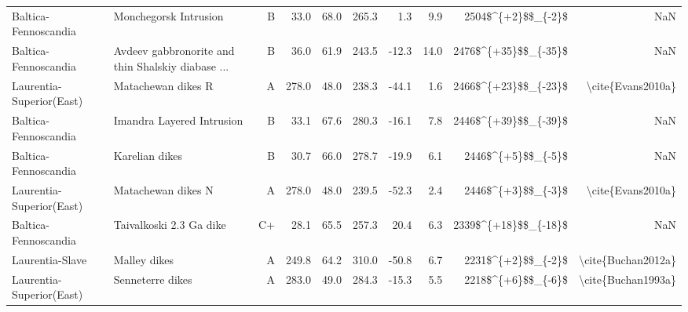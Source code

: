 \begin{longtable}{p{1 in}p{1 in}rrrrrrrr}
          Baltica-Fennoscandia &                              Monchegorsk Intrusion &      B &      33.0 &      68.0 & 265.3 &   1.3 &       9.9 &     2504\$\textasciicircum \{+2\}\$\$\_\{-2\}\$ &                                                NaN \\
          Baltica-Fennoscandia &  Avdeev gabbronorite and thin Shalskiy diabase ... &      B &      36.0 &      61.9 & 243.5 & -12.3 &      14.0 &   2476\$\textasciicircum \{+35\}\$\$\_\{-35\}\$ &                                                NaN \\
      Laurentia-Superior(East) &                                 Matachewan dikes R &      A &     278.0 &      48.0 & 238.3 & -44.1 &       1.6 &   2466\$\textasciicircum \{+23\}\$\$\_\{-23\}\$ &                                  \textbackslash cite\{Evans2010a\} \\
          Baltica-Fennoscandia &                          Imandra Layered Intrusion &      B &      33.1 &      67.6 & 280.3 & -16.1 &       7.8 &   2446\$\textasciicircum \{+39\}\$\$\_\{-39\}\$ &                                                NaN \\
          Baltica-Fennoscandia &                                     Karelian dikes &      B &      30.7 &      66.0 & 278.7 & -19.9 &       6.1 &     2446\$\textasciicircum \{+5\}\$\$\_\{-5\}\$ &                                                NaN \\
      Laurentia-Superior(East) &                                 Matachewan dikes N &      A &     278.0 &      48.0 & 239.5 & -52.3 &       2.4 &     2446\$\textasciicircum \{+3\}\$\$\_\{-3\}\$ &                                  \textbackslash cite\{Evans2010a\} \\
          Baltica-Fennoscandia &                            Taivalkoski 2.3 Ga dike &     C+ &      28.1 &      65.5 & 257.3 &  20.4 &       6.3 &   2339\$\textasciicircum \{+18\}\$\$\_\{-18\}\$ &                                                NaN \\
               Laurentia-Slave &                                       Malley dikes &      A &     249.8 &      64.2 & 310.0 & -50.8 &       6.7 &     2231\$\textasciicircum \{+2\}\$\$\_\{-2\}\$ &                                 \textbackslash cite\{Buchan2012a\} \\
      Laurentia-Superior(East) &                                   Senneterre dikes &      A &     283.0 &      49.0 & 284.3 & -15.3 &       5.5 &     2218\$\textasciicircum \{+6\}\$\$\_\{-6\}\$ &                                 \textbackslash cite\{Buchan1993a\} \\

\end{longtable}
